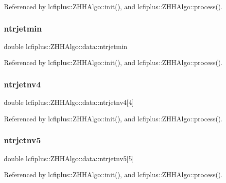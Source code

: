 Referenced by lcfiplus\+::\+Z\+H\+H\+Algo\+::init(), and lcfiplus\+::\+Z\+H\+H\+Algo\+::process().

\mbox{\label{structlcfiplus_1_1ZHHAlgo_1_1data_a22efd64b32cf4af50dcd899d26bb503c}} 
\subsubsection{ntrjetmin}
{\footnotesize\ttfamily double lcfiplus\+::\+Z\+H\+H\+Algo\+::data\+::ntrjetmin}



Referenced by lcfiplus\+::\+Z\+H\+H\+Algo\+::init(), and lcfiplus\+::\+Z\+H\+H\+Algo\+::process().

\mbox{\label{structlcfiplus_1_1ZHHAlgo_1_1data_aaacdf475e040dde3fe8582eb9cc3f23b}} 
\subsubsection{ntrjetnv4}
{\footnotesize\ttfamily double lcfiplus\+::\+Z\+H\+H\+Algo\+::data\+::ntrjetnv4[4]}



Referenced by lcfiplus\+::\+Z\+H\+H\+Algo\+::init(), and lcfiplus\+::\+Z\+H\+H\+Algo\+::process().

\mbox{\label{structlcfiplus_1_1ZHHAlgo_1_1data_a8a77ae7b9bb826ee8e09938d7a158a2a}} 
\subsubsection{ntrjetnv5}
{\footnotesize\ttfamily double lcfiplus\+::\+Z\+H\+H\+Algo\+::data\+::ntrjetnv5[5]}



Referenced by lcfiplus\+::\+Z\+H\+H\+Algo\+::init(), and lcfiplus\+::\+Z\+H\+H\+Algo\+::process().

\mbox{\label{structlcfiplus_1_1ZHHAlgo_1_1data_ae205e89392fccc030be84de4868703d4}} 
